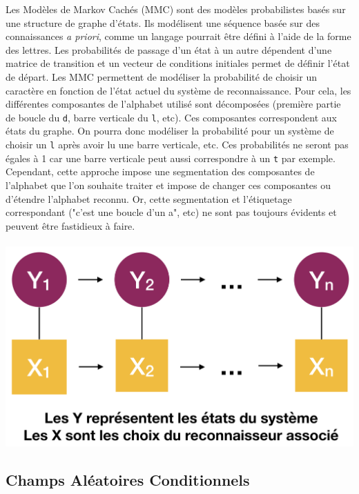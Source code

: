 Les Modèles de Markov Cachés (MMC) sont des modèles probabilistes basés sur une structure de
graphe d'états. Ils modélisent une séquence basée sur des connaissances \textit{a priori},
comme un langage pourrait être défini à l'aide de la forme des lettres. Les probabilités de passage
d'un état à un autre dépendent d'une matrice de transition et un vecteur de conditions initiales
permet de définir l'état de départ. Les MMC permettent de modéliser la probabilité de choisir un caractère
en fonction de l'état actuel du système de reconnaissance. Pour cela, les différentes composantes
de l'alphabet utilisé sont décomposées (première partie de boucle du \texttt{d}, barre verticale du \texttt{l}, etc).
Ces composantes correspondent aux états du graphe. On pourra donc modéliser la
probabilité pour un système de choisir un \texttt{l} après avoir lu une barre verticale, etc.
Ces probabilités ne seront pas égales à 1 car une barre verticale peut aussi correspondre à un
\texttt{t} par exemple. Cependant, cette approche impose une segmentation des composantes
de l'alphabet que l'on souhaite traiter et impose de changer ces composantes ou d'étendre
l'alphabet reconnu. Or, cette segmentation et l'étiquetage correspondant ("c'est une boucle d'un a", etc)
ne sont pas toujours évidents et peuvent être fastidieux à faire.

\newpage

\paragraph{}
\begin{mdframed}[frametitle={Schéma de transition et d'observation d'un MMC}, innerbottommargin=10]
\begin{center}
\includegraphics[width=0.6\linewidth]{mmc.png}
\end{center}
\end{mdframed}

\subsection{Champs Aléatoires Conditionnels}

